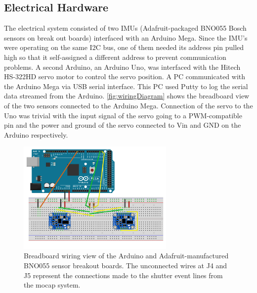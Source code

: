 \documentclass[letterpaper, 10 pt, conference]{ieeeconf}  %
\begin{document}
\subsection{Electrical Hardware}
The electrical system consisted of two IMUs (Adafruit-packaged BNO055 Bosch sensors on break out boards) interfaced with an Arduino Mega. Since the IMU's were operating on the same I2C bus, one of them needed its address pin pulled high so that it self-assigned a different address to prevent communication problems. A second Arduino, an Arduino Uno, was interfaced with the Hitech HS-322HD servo motor to control the servo position. A PC communicated with the Arduino Mega via USB serial interface. This PC used Putty to log the serial data streamed from the Arduino. \autoref{fig:wiringDiagram} shows the breadboard view of the two sensors connected to the Arduino Mega. Connection of the servo to the Uno was trivial with the input signal of the servo going to a PWM-compatible pin and the power and ground of the servo connected to Vin and GND on the Arduino respectively.

\begin{figure}[thpb]
	\centering
	\includegraphics[width = 3in]{Arduino_schematic_bb.pdf}
    \caption{Breadboard wiring view of the Arduino and Adafruit-manufactured BNO055 sensor breakout boards. The unconnected wires at J4 and J5 represent the connections made to the shutter event lines from the mocap system.}
    \label{fig:wiringDiagram}
\end{figure}
\end{document}
